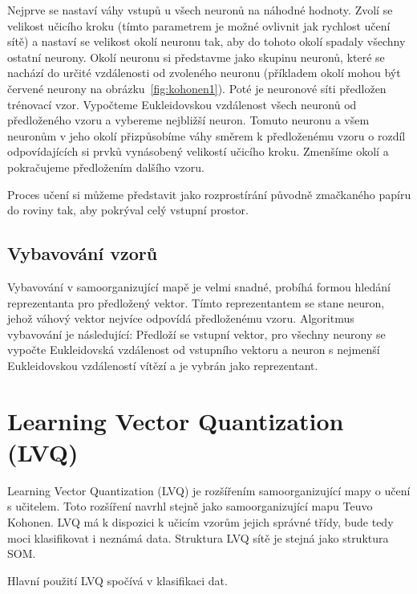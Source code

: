 \documentclass[11pt,twoside,a4paper]{book}
\begin{document}
Nejprve se nastaví váhy vstupů u všech neuronů na náhodné hodnoty. Zvolí se velikost učicího kroku (tímto parametrem je možné ovlivnit jak rychlost učení sítě) a nastaví se velikost okolí neuronu tak, aby do tohoto okolí spadaly všechny ostatní neurony. Okolí neuronu si představme jako skupinu neuronů, které se nachází do určité vzdálenosti od zvoleného neuronu (příkladem okolí mohou být červené neurony na obrázku~\ref{fig:kohonen1}). Poté je neuronové síti předložen trénovací vzor. Vypočteme Eukleidovskou vzdálenost všech neuronů od předloženého vzoru a vybereme nejbližší neuron. Tomuto neuronu a všem neuronům v jeho okolí přizpůsobíme váhy směrem k předloženému vzoru o rozdíl odpovídajících si prvků vynásobený velikostí učicího kroku. Zmenšíme okolí a pokračujeme předložením dalšího vzoru.

Proces učení si můžeme představit jako rozprostírání původně zmačkaného papíru do roviny tak, aby pokrýval celý vstupní prostor.
\subsection{Vybavování vzorů}
Vybavování v samoorganizující mapě je velmi snadné, probíhá formou hledání reprezentanta pro předložený vektor. Tímto reprezentantem se stane neuron, jehož váhový vektor nejvíce odpovídá předloženému vzoru. Algoritmus vybavování je následující: Předloží se vstupní vektor, pro všechny neurony se vypočte Eukleidovská vzdálenost od vstupního vektoru a neuron s nejmenší Eukleidovskou vzdáleností vítězí a je vybrán jako reprezentant.
\section{Learning Vector Quantization (LVQ)}
Learning Vector Quantization (LVQ) je rozšířením samoorganizující mapy o učení s učitelem. Toto rozšíření navrhl stejně jako samoorganizující mapu Teuvo Kohonen. LVQ má k dispozici k učicím vzorům jejich správné třídy, bude tedy moci klasifikovat i neznámá data. Struktura LVQ sítě je stejná jako struktura SOM.

Hlavní použití LVQ spočívá v klasifikaci dat.
\end{document}
